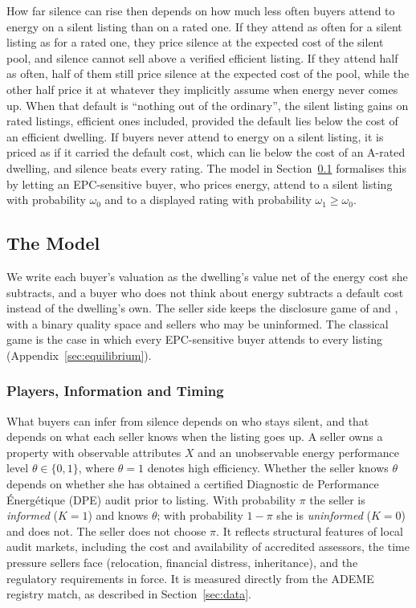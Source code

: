 How far silence can rise then depends on how much less often buyers attend to energy on a silent listing than on a rated one. If they attend as often for a silent listing as for a rated one, they price silence at the expected cost of the silent pool, and silence cannot sell above a verified efficient listing. If they attend half as often, half of them still price silence at the expected cost of the pool, while the other half price it at whatever they implicitly assume when energy never comes up. When that default is ``nothing out of the ordinary'', the silent listing gains on rated listings, efficient ones included, provided the default lies below the cost of an efficient dwelling. If buyers never attend to energy on a silent listing, it is priced as if it carried the default cost, which can lie below the cost of an A-rated dwelling, and silence beats every rating. The model in Section~\ref{ss:model} formalises this by letting an EPC-sensitive buyer, who prices energy, attend to a silent listing with probability $\omega_0$ and to a displayed rating with probability $\omega_1\ge\omega_0$.

\subsection{The Model}
\label{ss:model}
\label{ss:model_setup}
\label{ss:attention}

We write each buyer's valuation as the dwelling's value net of the energy cost she subtracts, and a buyer who does not think about energy subtracts a default cost instead of the dwelling's own. The seller side keeps the disclosure game of \citet{dye_disclosure_1985} and \citet{jung_kwon_1988}, with a binary quality space and sellers who may be uninformed. The classical game is the case in which every EPC-sensitive buyer attends to every listing (Appendix~\ref{sec:equilibrium}).

\subsubsection{Players, Information and Timing}

What buyers can infer from silence depends on who stays silent, and that depends on what each seller knows when the listing goes up. A seller owns a property with observable attributes $X$ and an unobservable energy performance level $\theta \in \{0,1\}$, where $\theta=1$ denotes high efficiency. Whether the seller knows $\theta$ depends on whether she has obtained a certified Diagnostic de Performance \'{E}nerg\'{e}tique (DPE) audit prior to listing. With probability $\pi$ the seller is \emph{informed} ($K=1$) and knows $\theta$; with probability $1-\pi$ she is \emph{uninformed} ($K=0$) and does not. The seller does not choose $\pi$. It reflects structural features of local audit markets, including the cost and availability of accredited assessors, the time pressure sellers face (relocation, financial distress, inheritance), and the regulatory requirements in force. It is measured directly from the ADEME registry match, as described in Section~\ref{sec:data}.

